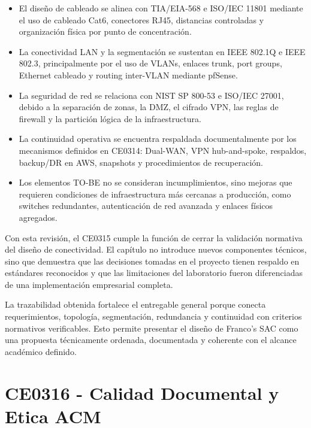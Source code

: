\documentclass[11pt, a4paper, oneside]{report}
\begin{document}
\begin{itemize}
    \item El diseño de cableado se alinea con TIA/EIA-568 e ISO/IEC 11801 mediante el uso de cableado Cat6, conectores RJ45, distancias controladas y organización física por punto de concentración.
    
    \item La conectividad LAN y la segmentación se sustentan en IEEE 802.1Q e IEEE 802.3, principalmente por el uso de VLANs, enlaces trunk, port groups, Ethernet cableado y routing inter-VLAN mediante pfSense.
    
    \item La seguridad de red se relaciona con NIST SP 800-53 e ISO/IEC 27001, debido a la separación de zonas, la DMZ, el cifrado VPN, las reglas de firewall y la partición lógica de la infraestructura.
    
    \item La continuidad operativa se encuentra respaldada documentalmente por los mecanismos definidos en CE0314: Dual-WAN, VPN hub-and-spoke, respaldos, backup/DR en AWS, snapshots y procedimientos de recuperación.
    
    \item Los elementos TO-BE no se consideran incumplimientos, sino mejoras que requieren condiciones de infraestructura más cercanas a producción, como switches redundantes, autenticación de red avanzada y enlaces físicos agregados.
\end{itemize}

Con esta revisión, el CE0315 cumple la función de cerrar la validación normativa del diseño de conectividad. El capítulo no introduce nuevos componentes técnicos, sino que demuestra que las decisiones tomadas en el proyecto tienen respaldo en estándares reconocidos y que las limitaciones del laboratorio fueron diferenciadas de una implementación empresarial completa.

La trazabilidad obtenida fortalece el entregable general porque conecta requerimientos, topología, segmentación, redundancia y continuidad con criterios normativos verificables. Esto permite presentar el diseño de Franco's SAC como una propuesta técnicamente ordenada, documentada y coherente con el alcance académico definido.

\chapter{CE0316 - Calidad Documental y Etica ACM}
\end{document}
